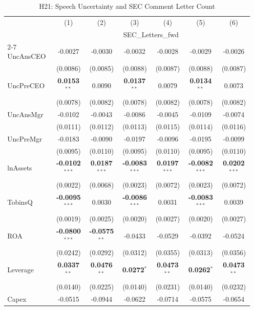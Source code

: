 \documentclass[11pt,a4paper]{article}
\begin{document}
\begin{table}[htbp]
\centering
\caption{H21: Speech Uncertainty and SEC Comment Letter Count}
\label{tab:h21}
\scriptsize
\begin{tabular}{lcccccc}
\toprule
 & (1) & (2) & (3) & (4) & (5) & (6) \\
 & \multicolumn{6}{c}{SEC\_Letters\_fwd} \\
\cmidrule(lr){2-7}
\midrule
UncAnsCEO & -0.0027 & -0.0030 & -0.0032 & -0.0028 & -0.0029 & -0.0026 \\
 & (0.0086) & (0.0085) & (0.0088) & (0.0087) & (0.0088) & (0.0087) \\
UncPreCEO & \textbf{0.0153}$^{**}$ & 0.0090 & \textbf{0.0137}$^{**}$ & 0.0079 & \textbf{0.0134}$^{**}$ & 0.0073 \\
 & (0.0078) & (0.0082) & (0.0078) & (0.0082) & (0.0078) & (0.0082) \\
UncAnsMgr & -0.0102 & -0.0043 & -0.0086 & -0.0045 & -0.0109 & -0.0074 \\
 & (0.0111) & (0.0112) & (0.0113) & (0.0115) & (0.0114) & (0.0116) \\
UncPreMgr & -0.0183 & -0.0090 & -0.0197 & -0.0096 & -0.0195 & -0.0099 \\
 & (0.0095) & (0.0110) & (0.0095) & (0.0110) & (0.0095) & (0.0110) \\
\midrule
lnAssets & \textbf{-0.0102}$^{***}$ & \textbf{0.0187}$^{***}$ & \textbf{-0.0083}$^{***}$ & \textbf{0.0197}$^{***}$ & \textbf{-0.0082}$^{***}$ & \textbf{0.0202}$^{***}$ \\
 & (0.0022) & (0.0068) & (0.0023) & (0.0072) & (0.0023) & (0.0072) \\
TobinsQ & \textbf{-0.0095}$^{***}$ & 0.0030 & \textbf{-0.0086}$^{***}$ & 0.0031 & \textbf{-0.0083}$^{***}$ & 0.0039 \\
 & (0.0019) & (0.0025) & (0.0020) & (0.0027) & (0.0020) & (0.0027) \\
ROA & \textbf{-0.0800}$^{***}$ & \textbf{-0.0575}$^{**}$ & -0.0433 & -0.0529 & -0.0392 & -0.0524 \\
 & (0.0242) & (0.0292) & (0.0312) & (0.0355) & (0.0313) & (0.0356) \\
Leverage & \textbf{0.0337}$^{**}$ & \textbf{0.0476}$^{**}$ & \textbf{0.0272}$^{*}$ & \textbf{0.0473}$^{**}$ & \textbf{0.0262}$^{*}$ & \textbf{0.0473}$^{**}$ \\
 & (0.0140) & (0.0225) & (0.0140) & (0.0231) & (0.0140) & (0.0232) \\
Capex & -0.0515 & -0.0944 & -0.0622 & -0.0714 & -0.0575 & -0.0654 \\

\end{tabular}
\end{table}
\end{document}
